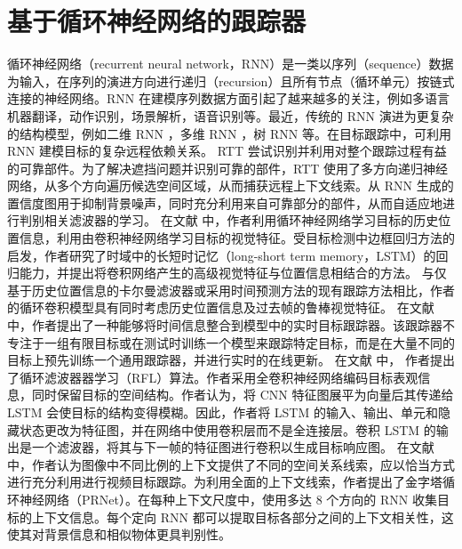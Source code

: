 \section{基于循环神经网络的跟踪器}
循环神经网络（recurrent neural network，RNN）是一类以序列（sequence）数据为输入，在序列的演进方向进行递归（recursion）且所有节点（循环单元）按链式连接的神经网络。RNN 在建模序列数据方面引起了越来越多的关注，例如多语言机器翻译，动作识别，场景解析，语音识别等。最近，传统的 RNN 演进为更复杂的结构模型，例如二维 RNN \cite{shuai2015quaddirectional}，多维 RNN \cite{stollenga2015parallel}，树 RNN \cite{tai2015improved} 等。在目标跟踪中，可利用 RNN 建模目标的复杂远程依赖关系。
RTT \cite{RTT} 尝试识别并利用对整个跟踪过程有益的可靠部件。为了解决遮挡问题并识别可靠的部件，RTT 使用了多方向递归神经网络，从多个方向遍历候选空间区域，从而捕获远程上下文线索。从 RNN 生成的置信度图用于抑制背景噪声，同时充分利用来自可靠部分的部件，从而自适应地进行判别相关滤波器的学习。%
在文献 \cite{SpatiallySupervised} 中，作者利用循环神经网络学习目标的历史位置信息，利用由卷积神经网络学习目标的视觉特征。受目标检测中边框回归方法的启发，作者研究了时域中的长短时记忆（long-short term memory，LSTM）的回归能力，并提出将卷积网络产生的高级视觉特征与位置信息相结合的方法。
与仅基于历史位置信息的卡尔曼滤波器或采用时间预测方法的现有跟踪方法相比，作者的循环卷积模型具有同时考虑历史位置信息及过去帧的鲁棒视觉特征。%
在文献 \cite{gordon2018re} 中，作者提出了一种能够将时间信息整合到模型中的实时目标跟踪器。该跟踪器不专注于一组有限目标或在测试时训练一个模型来跟踪特定目标，而是在大量不同的目标上预先训练一个通用跟踪器，并进行实时的在线更新。%
在文献 \cite{RecurrentFilter} 中，
作者提出了循环滤波器器学习（RFL）算法。作者采用全卷积神经网络编码目标表观信息，同时保留目标的空间结构。作者认为，将 CNN 特征图展平为向量后其传递给 LSTM 会使目标的结构变得模糊。因此，作者将 LSTM 的输入、输出、单元和隐藏状态更改为特征图，并在网络中使用卷积层而不是全连接层。卷积 LSTM 的输出是一个滤波器，将其与下一帧的特征图进行卷积以生成目标响应图。%
在文献 \cite{PRNet} 中，作者认为图像中不同比例的上下文提供了不同的空间关系线索，应以恰当方式进行充分利用进行视频目标跟踪。为利用全面的上下文线索，作者提出了金字塔循环神经网络（PRNet）。在每种上下文尺度中，使用多达 8 个方向的 RNN 收集目标的上下文信息。每个定向 RNN 都可以提取目标各部分之间的上下文相关性，这使其对背景信息和相似物体更具判别性。 %
